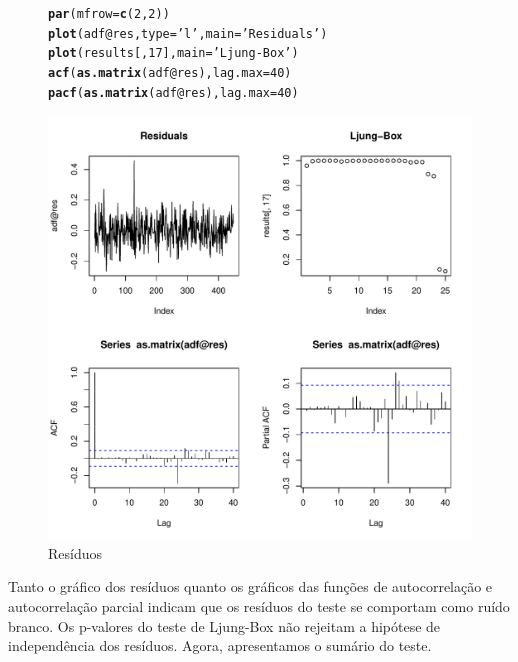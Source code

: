 \documentclass{article}\usepackage[]{graphicx}\usepackage[]{color}
\makeatletter
\def\maxwidth{ %
  \ifdim\Gin@nat@width>\linewidth
    \linewidth
  \else
    \Gin@nat@width
  \fi
}
\newcommand{\hlnum}[1]{\textcolor[rgb]{0.686,0.059,0.569}{#1}}%
\newcommand{\hlstr}[1]{\textcolor[rgb]{0.192,0.494,0.8}{#1}}%
\newcommand{\hlopt}[1]{\textcolor[rgb]{0,0,0}{#1}}%
\newcommand{\hlstd}[1]{\textcolor[rgb]{0.345,0.345,0.345}{#1}}%
\newcommand{\hlkwc}[1]{\textcolor[rgb]{0.333,0.667,0.333}{#1}}%
\newcommand{\hlkwd}[1]{\textcolor[rgb]{0.737,0.353,0.396}{\textbf{#1}}}%
\newenvironment{kframe}{%
 \def\at@end@of@kframe{}%
 \ifinner\ifhmode%
  \def\at@end@of@kframe{\end{minipage}}%
  \begin{minipage}{\columnwidth}%
 \fi\fi%
 \def\FrameCommand##1{\hskip\@totalleftmargin \hskip-\fboxsep
 \colorbox{shadecolor}{##1}\hskip-\fboxsep
     \hskip-\linewidth \hskip-\@totalleftmargin \hskip\columnwidth}%
 \MakeFramed {\advance\hsize-\width
   \@totalleftmargin\z@ \linewidth\hsize
   \@setminipage}}%
 {\par\unskip\endMakeFramed%
 \at@end@of@kframe}
\newenvironment{knitrout}{}{} %
\makeatother
\begin{document}
            \begin{figure}[H]
            \caption{Resíduos}
            \centering
\begin{knitrout}
\color{fgcolor}\begin{kframe}
\begin{alltt}
\hlkwd{par}\hlstd{(}\hlkwc{mfrow} \hlstd{=} \hlkwd{c}\hlstd{(}\hlnum{2}\hlstd{,}\hlnum{2}\hlstd{))}
\hlkwd{plot}\hlstd{(adf}\hlopt{@}\hlkwc{res}\hlstd{,} \hlkwc{type}\hlstd{=}\hlstr{'l'}\hlstd{,} \hlkwc{main}\hlstd{=}\hlstr{'Residuals'}\hlstd{)}
\hlkwd{plot}\hlstd{(results[,}\hlnum{17}\hlstd{],} \hlkwc{main}\hlstd{=}\hlstr{'Ljung-Box'}\hlstd{)}
\hlkwd{acf}\hlstd{(}\hlkwd{as.matrix}\hlstd{(adf}\hlopt{@}\hlkwc{res}\hlstd{),} \hlkwc{lag.max}\hlstd{=}\hlnum{40}\hlstd{)}
\hlkwd{pacf}\hlstd{(}\hlkwd{as.matrix}\hlstd{(adf}\hlopt{@}\hlkwc{res}\hlstd{),} \hlkwc{lag.max}\hlstd{=}\hlnum{40}\hlstd{)}
\end{alltt}
\end{kframe}
\includegraphics[width=\maxwidth]{figure/unnamed-chunk-84-1} 

\end{knitrout}
            \end{figure}

            Tanto o gráfico dos resíduos quanto os gráficos das funções de autocorrelação e autocorrelação parcial indicam que os resíduos do teste se comportam como ruído branco. Os p-valores do teste de Ljung-Box não rejeitam a hipótese de independência dos resíduos.
            Agora, apresentamos o sumário do teste.
            
\end{document}
